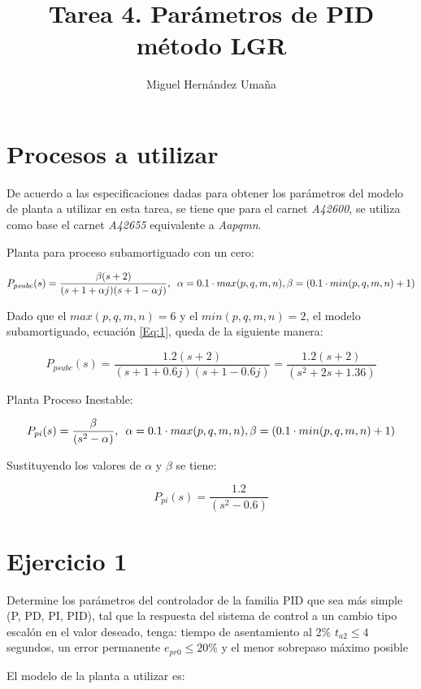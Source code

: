\documentclass{report}
\title{Tarea 4. Parámetros de PID método LGR}
\author{Miguel Hernández Umaña}
\begin{document}
\section{Procesos a utilizar}
De acuerdo a las especificaciones dadas para obtener los parámetros del 
modelo de planta a utilizar en esta tarea, se tiene que para el carnet \textit{A42600}, 
se utiliza como base el carnet \textit{A42655} equivalente a \textit{Aapqmn}.

Planta para proceso subamortiguado con un cero:

\begin{equation}
    P_{psubc}(s) = \frac{\beta(s+2)}{(s+1+\alpha j)(s+1-\alpha j)},\enskip \alpha = 0.1 \cdot max(p,q,m,n), \beta = (0.1 \cdot min(p,q,m,n)+1)
\label{Eq:1}
\end{equation}

Dado que el $max(p,q,m,n) = 6$ y el $min(p,q,m,n) = 2$, el modelo subamortiguado, ecuación \ref{Eq:1}, queda de la siguiente manera:

\begin{equation}
    P_{psubc}(s) = \frac{1.2(s+2)}{(s+1+0.6 j)(s+1-0.6 j)} = \frac{1.2(s+2)}{(s^2+2s+1.36)} 
\label{Eq:2}
\end{equation}

Planta Proceso Inestable:

\begin{equation}
    P_{pi}(s) = \frac{\beta}{(s^2-\alpha)},\enskip \alpha = 0.1 \cdot max(p,q,m,n), \beta = (0.1 \cdot min(p,q,m,n)+1) 
\label{Eq:3}
\end{equation}

Sustituyendo los valores de $\alpha$ y $\beta$ se tiene:

\begin{equation}
    P_{pi}(s) = \frac{1.2}{(s^2-0.6)}
\label{Eq:4}
\end{equation}

\section{Ejercicio 1}

Determine los parámetros del controlador de la familia PID que sea más simple (P,
PD, PI, PID), tal que la respuesta del sistema de control a un cambio tipo escalón en el valor
deseado, tenga: tiempo de asentamiento al 2\% $t_{a2} \leqslant 4$ segundos, un error permanente $e_{pr0} \leqslant 20\%$
y el menor sobrepaso máximo posible

El modelo de la planta a utilizar es:
\end{document}
